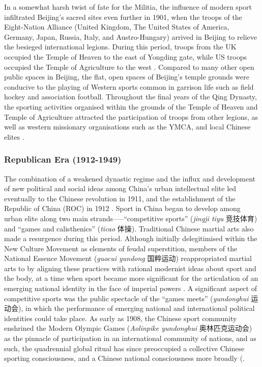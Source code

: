 In a somewhat harsh twist of fate for the Militia, the influence of modern sport infiltrated Beijing's sacred sites even further in 1901, when the troops of the Eight-Nation Alliance (United Kingdom, The United States of America, Germany, Japan, Russia, Italy, and Austro-Hungary) arrived in Beijing to relieve the besieged international legions.  During this period, troops from the UK occupied the Temple of Heaven to the east of Yongding gate, while US troops occupied the Temple of Agriculture to the west \citep{Brownell2008}. Compared to many other open public spaces in Beijing, the flat, open spaces of Beijing's temple grounds were conducive to the playing of Western sports common in garrison life such as field hockey and association football.  Throughout the final years of the Qing Dynasty, the sporting activities organised within the grounds of the Temple of Heaven and Temple of Agriculture attracted the participation of troops from other legions, as well as western missionary organisations such as the YMCA, and local Chinese elites \citep{Steel1985}.


\subsubsection{Republican Era (1912-1949)}
The combination of a weakened dynastic regime and the influx and development of new political and social ideas among China's urban intellectual elite led eventually to the Chinese revolution in 1911, and the establishment of the Republic of China (ROC) in 1912 \citep{Mitter2008}. Sport in China began to develop among urban elite along two main strands—--``competitive sports'' (\textit{jingji tiyu} 竞技体育) and ``games and calisthenics'' (\textit{ticao} 体操).  Traditional Chinese martial arts also made a resurgence during this period.  Although initially delegitimised within the New Culture Movement as elements of feudal superstition, members of the National Essence Movement (\textit{guocui yundong} 国粹运动) reappropriated martial arts to by aligning these practices with rational modernist ideas about sport and the body, at a time when sport became more significant for the articulation of an emerging national identity in the face of imperial powers \citep[38]{Brownell1995}\citep[45]{Morris2004}.  A significant aspect of competitive sports was the public spectacle of the ``games meets'' (\textit{yundonghui} 运动会), in which the performance of emerging national and international political identities could take place.  As early as 1908, the Chinese sport community enshrined the Modern Olympic Games (\textit{Aolinpike yundonghui} 奥林匹克运动会) as the pinnacle of participation in an international community of nations, and as such, the quadrennial global ritual has since preoccupied a collective Chinese sporting consciousness, and a Chinese national consciousness more broadly (\citep{Burnett2009;Barme2009;Brownell2008;Morris2004;Xu2008}.

